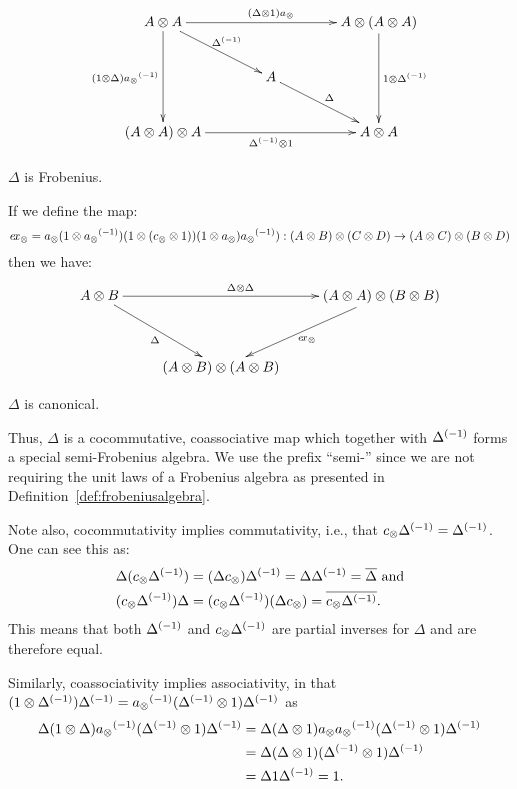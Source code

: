 \begin{definition}

  \[
    \xymatrix @C=40pt @R=25pt{
      A \* A \ar[dd]_{(1\*\Delta) \inv{a_{\*}}} \ar[dr]^{\inv{\Delta}}
      \ar[rr]^{(\Delta \* 1) a_{\*}} & &
      A \* (A \* A) \ar[dd]^{1 \* \inv{\Delta}}\\
      & A \ar[dr]^{\Delta} & \\
      (A \* A) \* A \ar[rr]_{\inv{\Delta} \* 1} & &
      A \* A
    }
  \]
\begin{center}$\Delta$ is Frobenius.\end{center}
If we define the map:
  \[
    e\!x_{\otimes} =  a_{\otimes}(1\otimes{a_{\otimes}}^{(-1)})(1\otimes(c_{\otimes}\otimes1))(1\otimes a_{\otimes}){a_{\otimes}}^{(-1)}): (A\otimes B)\otimes(C\otimes D) \to (A\otimes C) \otimes (B\otimes D)
  \]
then we have:
  \[
    \xymatrix @C=25pt @R=35pt{
      A \* B \ar[dr]_{\Delta}
      \ar[rr]^{\Delta \* \Delta} && (A \* A) \* (B \* B) \ar[dl]^{\excs}\\
      &(A \* B) \* (A \* B)
    }
  \]
\begin{center}$\Delta$ is canonical.\end{center}

  Thus, $\Delta$ is a cocommutative, coassociative map which together with ${\Delta}^{(-1)}$ forms a
  special semi-Frobenius algebra. We use the prefix ``semi-'' since we are not requiring the unit laws
  of a Frobenius algebra as presented in Definition~\ref{def:frobeniusalgebra}.
\end{definition}

Note also, cocommutativity implies commutativity, i.e., that $c_{\otimes}{\Delta}^{(-1)} = {\Delta}^{(-1)}$.
One can see this as:
\begin{align*}
  \Delta(c_{\otimes}{\Delta}^{(-1)})
  &= (\Delta c_{\otimes}){\Delta}^{(-1)} = \Delta{\Delta}^{(-1)} = \overline{\Delta} \text{ and}\\
  (c_{\otimes}{\Delta}^{(-1)})\Delta
  & = (c_{\otimes}{\Delta}^{(-1)})(\Delta c_{\otimes}) = \overline{c_{\otimes}{\Delta}^{(-1)}}.
\end{align*}
This means that both ${\Delta}^{(-1)}$ and $c_{\otimes}{\Delta}^{(-1)}$ are partial inverses for $\Delta$
and are therefore equal.

Similarly, coassociativity implies associativity, in that
$(1\otimes{\Delta}^{(-1)}){\Delta}^{(-1)} =  {a_{\otimes}}^{(-1)}({\Delta}^{(-1)}\otimes 1){\Delta}^{(-1)}$ as
\begin{align*}
  \Delta(1\otimes\Delta){a_{\otimes}}^{(-1)}({\Delta}^{(-1)}\otimes 1){\Delta}^{(-1)} &=
  \Delta(\Delta\otimes1)a_{\otimes}{a_{\otimes}}^{(-1)}({\Delta}^{(-1)}\otimes 1){\Delta}^{(-1)} \\
  & =\Delta(\Delta\otimes1)({\Delta}^{(-1)}\otimes 1){\Delta}^{(-1)} \\
  & =\Delta 1{\Delta}^{(-1)} = 1.
\end{align*}


